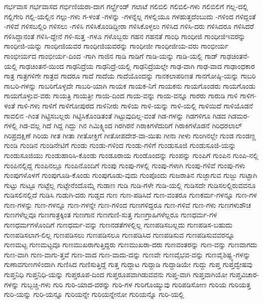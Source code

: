{ಗರ್ಭವಾಸ
ಗರ್ಭವಾಸದ
ಗರ್ಭಿಣಿಯರಾ-ದಾಗ
ಗರ್ಲ್ಫ್ರೆಂಡ್
ಗಲಾಟೆ
ಗಲಿಬಿಲಿ
ಗಲಿಬಿಲಿ-ಗಳು
ಗಲಿಬಿಲಿಗೆ
ಗಲ್ಲ-ದಲ್ಲಿ
ಗಲ್ಲಿಗೇರಿ
ಗಲ್ಲಿ-ಯಲ್ಲಿನ
ಗಲ್ಲು-ಗಳು
ಗ-ಳಂತೆ
-ಗಳನ್ನು
-ಗಳನ್ನೆಲ್ಲ
ಗಳಲ್ಲಿಯೂ
ಗಳಹುತ್ತದೆಂಬುದು
-ಗಳಿಂದ
ಗಳಿದ್ದಂತೆ
-ಗಳಿವೆ
ಗಳಿಸಬಲ್ಲಿರಿ
ಗಳಿಸಲು
-ಗಳಿಸಿ
ಗಳಿಸಿಕೊಂಡಿದ್ದೀರಾ
ಗಳಿಸಿಕೊಳ್ಳಲು
ಗಳಿಸಿದ
ಗಳಿಸಿ-ದರು
ಗಳಿಸಿದರೂ
ಗಳಿಸಿದರೆ
ಗಳಿಸಿದ್ದಾನಂತೆ
ಗಳಿಸಿ-ದ್ದೇನೆ
ಗಳಿ-ಸುತ್ತ
-ಗಳೂ
ಗಳೊಬ್ಬರು
ಗಹನ
ಗಹನತೆ
ಗಾಂಧಿ
ಗಾಂಧೀಜಿ
ಗಾಂಧೀಜಿಇವರನ್ನು
ಗಾಂಧೀಜಿ-ಯನ್ನು
ಗಾಂಧೀಜಿಯವರ
ಗಾಂಧೀಜಿಯವರನ್ನು
ಗಾಂಧೀಜೀ
ಗಾಂಧೀಜೀಯ-ವರು
ಗಾಂಭೀರ್ಯ
ಗಾಂಭೀರ್ಯದ
ಗಾಂಭೀರ್ಯ-ದಿಂದ
-ಗಾಗಿ
ಗಾಜಿನ
ಗಾಡಿ
ಗಾಡಿಗೆ
ಗಾಡಿ-ಯನ್ನು
ಗಾಡಿ-ಯಲ್ಲಿ
ಗಾಡ್
ಗಾಢಚಿಂತನೆ-ಯಲ್ಲಿ
ಗಾಢಚಿಂತನೆ-ಯಿಂದ
ಗಾಢನಿದ್ರೆಯ
ಗಾಢನಿದ್ರೆ-ಯಲ್ಲಿ
ಗಾಢನಿದ್ರೆಯಲ್ಲೇ
ಗಾಢ-ವಾಗಿ
ಗಾಢ-ವಾದ
ಗಾಢಾಂಧಕಾರ
ಗಾತ್ರ
ಗಾತ್ರಗಳಿಗೇ
ಗಾತ್ರದ
ಗಾದರೂ
ಗಾದೆ
ಗಾದೆಯ
ಗಾದೆಯೊಂದನ್ನು
ಗಾನಕಲಾಪರಿಣತ
ಗಾನಗೋಷ್ಠಿ-ಯನ್ನು
ಗಾಬರಿ
ಗಾಬರಿ-ಗಳನ್ನು
ಗಾಬರಿಗೊಳ್ಳದೇ
ಗಾಬರಿ-ಯಾಗಿ
ಗಾಯಕ
ಗಾಯಕ-ನಿಗೆ
ಗಾಯಕನು
ಗಾಯಗೊಂಡರು
ಗಾಯಗೊಂಡು
ಗಾಯಗೊಳ್ಳುವ-ವರು
ಗಾಯತ್ರಿ
ಗಾಯತ್ರೀ
ಗಾಯ-ದಿಂದ
ಗಾಯ-ವನ್ನು
ಗಾಯ-ವನ್ನೂ
ಗಾರರು
ಗಾರುಡಿ
ಗಾಳಿ
ಗಾಳಿಗ-ಳಂತೆ
ಗಾಳಿ-ಗಳು
ಗಾಳಿಗೆ
ಗಾಳಿಗೋಪುರದ
ಗಾಳಿನೀರು
ಗಾಳಿಯ
ಗಾಳಿ-ಯನ್ನು
ಗಾಳಿ-ಯಲ್ಲಿ
ಗಾಳಿಯಿದೆ
ಗಾಳಿಯೊಡನೆ
ಗಾವಲಿನ
-ಗಿಂತ
ಗಿಟ್ಟಿಸಬಲ್ಲರು
ಗಿಟ್ಟಿಸಿಕೊಂಡಿತಂತೆ
ಗಿಟ್ಟುವುದಿಲ್ಲ-ವಂತೆ
ಗಿಡ-ಗಳನ್ನು
ಗಿಡಗಳಿಗೂ
ಗಿಡದ
ಗಿಡಮರ-ಗಳಲ್ಲಿ
ಗಿಡ-ವಲ್ಲ
ಗಿದೆ
ಗಿದ್ದ
ಗಿದ್ದು
ಗಿನ
ಗಿಮಿಕ್ಸ್ನಿಂದ
ಗಿರಗಿರನೆ
ಗಿರಾಕಿಗಳೆದುರಿಗೆ
ಗಿರಾಕಿಗಳೊಡನೆ
ಗಿರಿಧರಲಾಲ್
ಗಿರಿಪ್ರದಕ್ಷಿಣೆ
ಗಿರಿಯ
ಗೀತ
ಗೀತಾ
ಗೀತೋಕ್ತಿಗೆ
ಗೀತೋಪದೇಶ-ವಾ-ಯಿತು
ಗೀನಾ
ಗೀಳು
ಗುಂಗಿನಲ್ಲೇ
ಗುಂಡ
ಗುಂಡಣ್ಣ
ಗುಂಡಿ
ಗುಂಡಿನ
ಗುಂಡಿನೇಟಿಗೆ
ಗುಂಡು
ಗುಂಡು-ಗಳಿಂದ
ಗುಂಡು-ಗಳಿಗೆ
ಗುಂಡುಸೂಜಿ
ಗುಂಡುಸೂಜಿ-ಯನ್ನು
ಗುಂಡುಸೂಜಿಯು
ಗುಂಡುಹಾರಿಸಿ-ಕೊಂಡು
ಗುಂಡೂರಾಯ
ಗುಂಡೊಂದನ್ನು
ಗುಂಪನ್ನು
ಗುಂಪಿಗೆ
ಗುಂಪಿನ
ಗುಂಪಿ-ನಲ್ಲಿ
ಗುಂಪಿನಲ್ಲಿದ್ದ
ಗುಂಪಿನಲ್ಲೂ
ಗುಂಪಿನೊಂದಿಗೆ
ಗುಂಪು
ಗುಂಪು-ಗಳಲ್ಲಿ
ಗುಂಪು-ಗಳಾಗಿ
ಗುಂಪು-ಗಳಿವೆ
ಗುಂಪು-ಗಳು
ಗುಂಪುಗಳೊಳಗೆ
ಗುಂಪುಗೂಡಿ-ಕೊಂಡು
ಗುಂಪುಗೂಡು-ವುದು
ಗುಂಪೊಂದು
ಗುಜರಾತಿನ
ಗುಜ್ಜಾಗುವ
ಗುಜ್ಜು
ಗುಟ್ಟಾಗಿ
ಗುಟ್ಟು
ಗುಟ್ಟೂ
ಗುಟ್ಟೆಲ್ಲ
ಗುಟ್ಟೇನೆಂದೊಮ್ಮೆ
ಗುಡಾಣ
ಗುಡಿ
ಗುಡಿ-ಗಳೇ
ಗುಡಿ-ಯಲ್ಲಿ
ಗುಡಿಸದೇ
ಗುಡಿಸಲಲ್ಲಿರುವವನೂ
ಗುಡಿಸಲಿನಲ್ಲಿದೆ
ಗುಡಿಸಿ
ಗುಡುಗಿ-ದರು
ಗುಡ್ಡದ
ಗುಣ
ಗುಣ-ಪಡಿಸಿದೆ
ಗುಣ-ವಂತರೂ
ಗುಣಕರ್ಮ-ಗಳನ್ನೂ
ಗುಣ-ಗಳ
ಗುಣ-ಗಳನ್ನು
ಗುಣ-ಗಳನ್ನೂ
ಗುಣ-ಗಳನ್ನೇ
ಗುಣ-ಗಳಿಂದ
ಗುಣಗಳಿದ್ದರೂ
ಗುಣ-ಗಳಿವೆ
ಗುಣ-ಗಳು
ಗುಣಗಳುಶೌಚ
ಗುಣಗಳೆಲ್ಲವೂ
ಗುಣಗಾತ್ರಕ್ಕಿಂತ
ಗುಣಗಾನ
ಗುಣಗುಣಿ-ಸುತ್ತ
ಗುಣಗ್ರಾಹಿಗಳೆಲ್ಲರೂ
ಗುಣಧರ್ಮ-ಗಳ
ಗುಣಧರ್ಮಗಳೊಂದಿಗೆ
ಗುಣಧರ್ಮ-ವನ್ನು
ಗುಣನಡತೆಗಳಲ್ಲಿಲ್ಲ
ಗುಣಪಡಿಸಬಲ್ಲದು
ಗುಣಪಡಿಸ-ಬಹುದು
ಗುಣಪಡಿಸಲಾಗ-ಲಿಲ್ಲ
ಗುಣಪಡಿಸಲು
ಗುಣಪಡಿಸಲೂ
ಗುಣಪಡಿಸಿದ
ಗುಣಪಡಿಸುವ
ಗುಣಪಡಿಸುವವರನ್ನೂ
ಗುಣಮಟ್ಟ
ಗುಣಮಟ್ಟವೂ
ಗುಣಮುಖರಾಗುತ್ತಿದ್ದರು
ಗುಣಮುಖರಾ-ದರು
ಗುಣವಂತರನ್ನು
ಗುಣ-ವನ್ನು
ಗುಣವಾಗದು
ಗುಣ-ವಾಗಿ
ಗುಣ-ವಾಗು-ತ್ತವೆ
ಗುಣ-ವಾದ
ಗುಣ-ವಾದು-ದನ್ನು
ಗುಣವೇ
ಗುಣವೈಭವ-ವನ್ನು
ಗುಣವೈಶಿಷ್ಟ್ಯ-ಗಳನ್ನು
ಗುಣಾವಗುಣಗಳಿಂದಾಗಿ
ಗುಣಿಸಿದ
ಗುಣಿಸುತ್ತಿದ್ದೆ
ಗುತ್ತ
ಗುದ್ದಾಟ
ಗುದ್ದಾಡಿ
ಗುದ್ದಾಡಿಯೇ
ಗುದ್ದು
ಗುಪ್ತ
ಗುಪ್ತದ್ವೇಷವು
ಗುಪ್ತನಿಧಿ
ಗುಪ್ತನಿಧಿ-ಯನ್ನು
ಗುಪ್ತರೂಪ-ದಿಂದ
ಗುಪ್ತರೂಪವಾಗಿಡುವವನು
ಗುಪ್ತ-ವಾಗಿ
ಗುಪ್ತವಾಗಿಯೋ
ಗುಪ್ತವಿಚಾರ-ಗಳನ್ನು
ಗುಬ್ಬಚ್ಚಿ-ಗಳು
ಗುರಿ
ಗುರಿ-ಯಾದ-ವರನ್ನು
ಗುರಿ-ಗಳ
ಗುರಿಗೊಯ್ಯುವು
ಗುರಿಪಡಿಸೋಣ
ಗುರಿಯ
ಗುರಿಯತ್ತ
ಗುರಿ-ಯನ್ನು
ಗುರಿ-ಯನ್ನೂ
ಗುರಿಯನ್ನೇ
ಗುರಿಯನ್ನೇನೋ
ಗುರಿಯನ್ನೊ
ಗುರಿ-ಯಲ್ಲಿ
}

